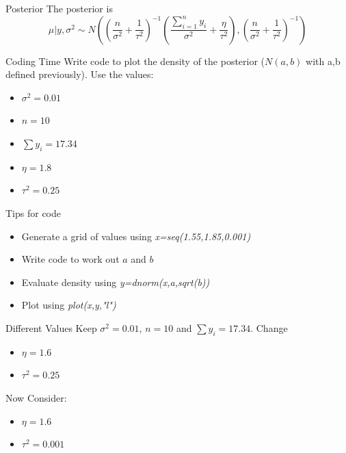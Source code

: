 \documentclass[10pt]{beamer}
\begin{document}
\begin{frame}{Posterior}
  The posterior is
  \begin{equation}
    \mu|y,\sigma^2\sim N\left(
      \left(\frac{n}{\sigma^2}+\frac{1}{\tau^2}\right)^{-1}\left(\frac{\sum\limits_{i=1}^{n} y_i}{\sigma^2}+\frac{\eta}{\tau^2}\right),
      \left(\frac{n}{\sigma^2}+\frac{1}{\tau^2}\right)^{-1}
    \right)
  \end{equation}
\end{frame}
\begin{frame}{Coding Time}
  Write code to plot the density of the posterior ($N(a,b)$ with a,b defined previously).
  Use the values:
  \begin{itemize}
  \item $\sigma^2=0.01$
  \item $n=10$
  \item $\sum y_i=17.34$
  \item $\eta=1.8$
  \item $\tau^2=0.25$
  \end{itemize}
\end{frame}
\begin{frame}{Tips for code}
  \begin{itemize}
  \item Generate a grid of values using {\em x=seq(1.55,1.85,0.001)}

  \item Write code to work out $a$ and $b$

  \item Evaluate density using {\em y=dnorm(x,a,sqrt(b))}

  \item Plot using {\em plot(x,y,"l")}
  \end{itemize}
\end{frame}
\begin{frame}{Different Values}
  Keep $\sigma^2=0.01$, $n=10$ and $\sum y_i=17.34$.  Change

  \begin{itemize}
  \item $\eta=1.6$
  \item $\tau^2=0.25$
  \end{itemize}

  Now Consider:
  \begin{itemize}
  \item $\eta=1.6$
  \item $\tau^2=0.001$
  \end{itemize}
\end{frame}
\end{document}
